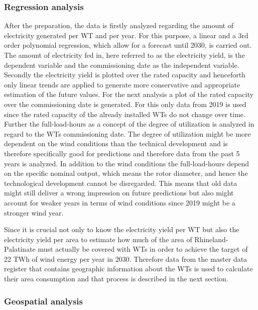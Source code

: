 \documentclass[a4paper,11pt]{article}
\begin{document}
\hypertarget{regression-analysis-1}{%
\subsubsection{Regression analysis}\label{regression-analysis-1}}

After the preparation, the data is firstly analyzed regarding the amount of electricity generated per WT and per year. For this purpose, a linear and a 3rd order polynomial regression, which allow for a forecast until 2030, is carried out. The amount of electricity fed in, here referred to as the electricity yield, is the dependent variable and the commissioning date as the independent variable. Secondly the electricity yield is plotted over the rated capacity and henceforth only linear trends are applied to generate more conservative and appropriate estimation of the future values. For the next analysis a plot of the rated capacity over the commissioning date is generated. For this only data from 2019 is used since the rated capacity of the already installed WTs do not change over time. Further the full-load-hours as a concept of the degree of utilization is analyzed in regard to the WTs commissioning date. The degree of utilization might be more dependent on the wind conditions than the technical development and is therefore specifically good for predictions and therefore data from the past 5 years is analyzed. In addition to the wind conditions the full-load-hours depend on the specific nominal output, which means the rotor diameter, and hence the technological development cannot be disregarded. This means that old data might still deliver a wrong impression on future predictions but also might account for weaker years in terms of wind conditions since 2019 might be a stronger wind year.

Since it is crucial not only to know the electricity yield per WT but also the electricity yield per area to estimate how much of the area of Rhineland-Palatinate must actually be covered with WTs in order to achieve the target of 22 TWh of wind energy per year in 2030. Therefore data from the master data register that contains geographic information about the WTs is used to calculate their area consumption and that process is described in the next section.

\hypertarget{geospatial-analysis-1}{%
\subsubsection{Geospatial analysis}\label{geospatial-analysis-1}}
\end{document}
